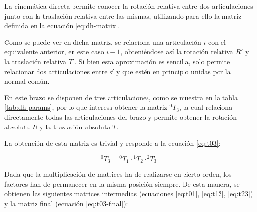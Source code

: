 La cinemática directa permite conocer la rotación relativa entre dos articulaciones
junto con la traslación relativa entre las mismas, utilizando para ello la matriz
definida en la ecuación \ref{eq:dh-matrix}.

Como se puede ver en dicha matriz, se relaciona una articulación $i$ con el equivalente
anterior, en este caso $i - 1$, obteniéndose así la rotación relativa $R'$ y la
traslación relativa $T'$. Si bien esta aproximación es sencilla, solo permite relacionar
dos articulaciones entre sí y que estén en principio unidas por la normal común.

En este brazo se disponen de tres articulaciones, como se muestra en la tabla
\ref{tab:dh-params}, por lo que interesa obtener la matriz $^{0}T_{3}$, la cual relaciona
directamente todas las articulaciones del brazo y permite obtener la rotación absoluta
$R$ y la traslación absoluta $T$.

La obtención de esta matriz es trivial y responde a la ecuación \ref{eq:t03}:

\begin{equation}
    \label{eq:t03}
    ^0T_3 = {^0T_1} \cdot {^1T_2} \cdot {^2T_3}
\end{equation}

Dada que la multiplicación de matrices ha de realizarse en cierto orden, los
factores han de permanecer en la misma posición siempre. De esta manera, se obtienen
las siguientes matrices intermedias (ecuaciones \ref{eq:t01}, \ref{eq:t12}, \ref{eq:t23})
y la matriz final (ecuación \ref{eq:t03-final}):

